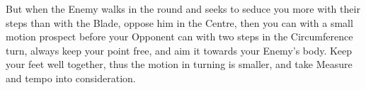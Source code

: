 \newpage


\newpage


But when the Enemy walks in the round and seeks to seduce you more
with their steps than with the Blade, oppose him in the Centre, then
you can with a small motion prospect before your Opponent can with two
steps in the Circumference turn, always keep your point free, and aim
it towards your Enemy's body. Keep your feet well together, thus the
motion in turning is smaller, and take Measure and tempo into consideration.



